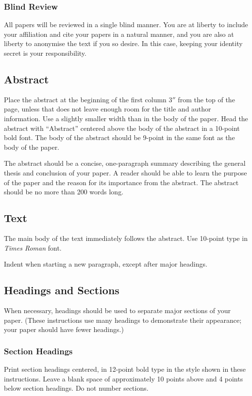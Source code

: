 \documentclass[letterpaper]{article}
\begin{document}
\subsubsection{Blind Review}
All papers will be reviewed in a single blind manner.  You are at liberty
to include your affiliation and cite your papers in a natural manner, and
you are also at liberty to anonymise the text if you so desire. In this case,
keeping your identity secret is your responsibility.

\subsection{Abstract}
Place the abstract at the beginning of the first column 3$''$ from the
top of the page, unless that does not leave enough room for the title
and author information. Use a slightly smaller width than in the body
of the paper. Head the abstract with ``Abstract'' centered above the
body of the abstract in a 10-point bold font. The body of the abstract
should be 9-point in the same font as the body of the paper.

The abstract should be a concise, one-paragraph summary describing the
general thesis and conclusion of your paper. A reader should be able
to learn the purpose of the paper and the reason for its importance
from the abstract. The abstract should be no more than 200 words long.

\subsection{Text}
The main body of the text immediately follows the abstract. Use
10-point type in {\em Times Roman} font.

Indent when starting a new paragraph, except after major headings.

\subsection{Headings and Sections}
When necessary, headings should be used to separate major sections of
your paper. (These instructions use many headings to demonstrate their
appearance; your paper should have fewer headings.)

\subsubsection{Section Headings}
Print section headings centered, in 12-point bold type in the style shown in
these instructions. Leave a blank space of approximately 10 points
above and 4 points below section headings.  Do not number sections.
\end{document}
